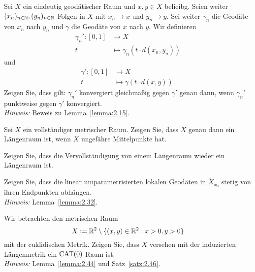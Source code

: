 	\begin{aufgabe}
		\label{aufg:5.3}	
		Sei $X$ ein eindeutig geodätischer Raum und $x,y \in X$ belieibg.
		Seien weiter $(x_n)_{n \in \mathbb{N}}, (y_n)_{n \in \mathbb{N}}$ Folgen in $X$ mit $x_n \rightarrow x$ und $y_n \rightarrow y$.
		Sei weiter $\gamma_n$ die Geodäte von $x_n$ nach $y_n$ und $\gamma$ die Geodäte von $x$ nach $y$.
		Wir definieren
		\begin{align*}
			\gamma_n'\colon [0,1] &\longrightarrow X \\
			t &\longmapsto \gamma_n(t \cdot d(x_n,y_n))
		\end{align*}
		und
		\begin{align*}
			\gamma'\colon [0,1] &\longrightarrow X \\
			t &\longmapsto \gamma(t \cdot d(x,y)).
		\end{align*}
		Zeigen Sie, dass gilt:
		$\gamma_n'$ konvergiert gleichmäßig gegen $\gamma'$ genau dann, wenn $\gamma_n'$ punktweise gegen $\gamma'$ konvergiert. \\
		\textit{Hinweis:} Beweis zu Lemma~\ref{lemma:2.15}.
	\end{aufgabe}

	\begin{aufgabe}
		\label{aufg:5.4}	
		Sei $X$ ein vollständiger metrischer Raum.
		Zeigen Sie, dass $X$ genau dann ein Längenraum ist, wenn $X$ ungefähre Mittelpunkte hat.
	\end{aufgabe}
	
	\begin{aufgabe}
		\label{aufg:5.5}	
		Zeigen Sie, dass die Vervollständigung von einem Längenraum wieder ein Längenraum ist.
	\end{aufgabe}
	
	\begin{aufgabe}
		\label{aufg:6.1}
		Zeigen Sie, dass die linear umparametrisierten lokalen Geodäten in $\tilde{X}_{x_0}$ stetig von ihren Endpunkten abhängen. \\
		\textit{Hinweis:} Lemma~\ref{lemma:2.32}.
	\end{aufgabe}
	
	\begin{aufgabe}
		\label{aufg:6.2}
		Wir betrachten den metrischen Raum
		\[
			X := \mathbb{R}^2 \setminus \{(x,y) \in \mathbb{R}^2 : x > 0, y>0\}
		\]
		mit der euklidischen Metrik.
		Zeigen Sie, dass $X$ versehen mit der induzierten Längenmetrik ein $\operatorname{CAT(0)}$-Raum ist. \\
		\textit{Hinweis:} Lemma~\ref{lemma:2.44} und Satz~\ref{satz:2.46}.
	\end{aufgabe}
	
